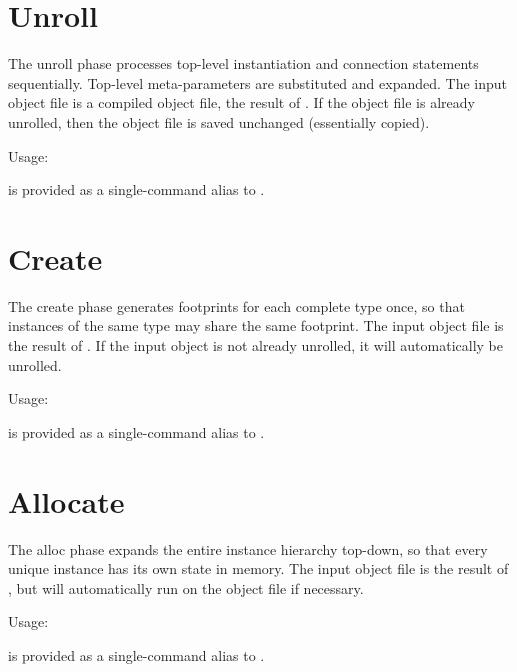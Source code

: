 \section{Unroll}
\label{sec:compiler:unroll}

The unroll phase processes top-level instantiation and connection 
statements sequentially.  Top-level meta-parameters are substituted
and expanded.  
The input object file is a compiled object file, the result of
.  
If the object file is already unrolled, then the object file
is saved unchanged (essentially copied).  

Usage: \binhackt\   

 is provided as a single-command alias to .  

\section{Create}
\label{sec:compiler:create}

The create phase generates footprints for each complete type once, 
so that instances of the same type may share the same footprint.  
The input object file is the result of .  
If the input object is not already unrolled, it will automatically
be unrolled.  

Usage: \binhackt\   

 is provided as a single-command alias to .  

\section{Allocate}
\label{sec:compiler:alloc}

The alloc phase expands the entire instance hierarchy top-down, 
so that every unique instance has its own state in memory.  
The input object file is the result of , 
but will automatically run  on the object file if necessary.  

Usage: \binhackt\   

 is provided as a single-command alias to .  

